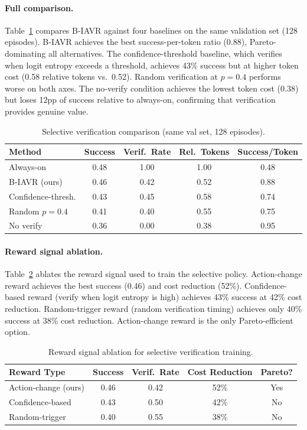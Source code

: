 \documentclass[10pt]{article}
\newcommand{\ours}{B-IAVR}
\begin{document}
\paragraph{Full comparison.}
Table~\ref{tab:full_comparison} compares \ours{} against four baselines on the same validation set (128 episodes). \ours{} achieves the best success-per-token ratio (0.88), Pareto-dominating all alternatives. The confidence-threshold baseline, which verifies when logit entropy exceeds a threshold, achieves 43\% success but at higher token cost (0.58 relative tokens vs.\ 0.52). Random verification at $p{=}0.4$ performs worse on both axes. The no-verify condition achieves the lowest token cost (0.38) but loses 12pp of success relative to always-on, confirming that verification provides genuine value.

\begin{table}[h]
\centering
\caption{Selective verification comparison (same val set, 128 episodes).}
\label{tab:full_comparison}
\begin{tabular}{lcccc}
\toprule
Method & Success & Verif.\ Rate & Rel.\ Tokens & Success/Token \\
\midrule
Always-on         & 0.48 & 1.00 & 1.00 & 0.48 \\
\ours{} (ours)    & 0.46 & 0.42 & 0.52 & 0.88 \\
Confidence-thresh.& 0.43 & 0.45 & 0.58 & 0.74 \\
Random $p{=}0.4$  & 0.41 & 0.40 & 0.55 & 0.75 \\
No verify         & 0.36 & 0.00 & 0.38 & 0.95 \\
\bottomrule
\end{tabular}
\end{table}

\paragraph{Reward signal ablation.}
Table~\ref{tab:reward_ablation} ablates the reward signal used to train the selective policy. Action-change reward achieves the best success (0.46) and cost reduction (52\%). Confidence-based reward (verify when logit entropy is high) achieves 43\% success at 42\% cost reduction. Random-trigger reward (random verification timing) achieves only 40\% success at 38\% cost reduction. Action-change reward is the only Pareto-efficient option.

\begin{table}[h]
\centering
\caption{Reward signal ablation for selective verification training.}
\label{tab:reward_ablation}
\begin{tabular}{lcccc}
\toprule
Reward Type & Success & Verif.\ Rate & Cost Reduction & Pareto? \\
\midrule
Action-change (ours) & 0.46 & 0.42 & 52\% & Yes \\
Confidence-based     & 0.43 & 0.50 & 42\% & No \\
Random-trigger       & 0.40 & 0.55 & 38\% & No \\
\bottomrule
\end{tabular}
\end{table}
\end{document}
